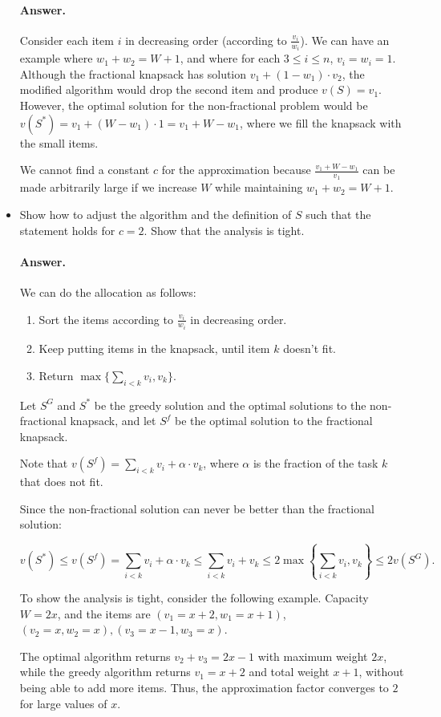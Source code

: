\documentclass[a4paper]{article}
\begin{document}
\begin{itemize}
	\paragraph{Answer.}
	
	Consider each item $i$ in decreasing order (according to $\frac{v_i}{w_i}$). We can have an example where $w_1 + w_2 = W + 1$, and where for each $3 \le i \le n$, $v_i = w_i = 1$.
	Although the fractional knapsack has solution $v_1 + (1-w_1)\cdot v_2$, the modified algorithm would drop the second item and produce $v(S) = v_1$. However, the optimal solution for the non-fractional problem would be $v(S^\ast) = v_1 + (W - w_1)\cdot 1 = v_1 + W - w_1$, where we fill the knapsack with the small items.
	
	We cannot find a constant $c$ for the approximation because $\frac{v_1 + W - w_1}{v_1}$ can be made arbitrarily large if we increase $W$ while maintaining $w_1 + w_2 = W+ 1$.
	
	\medskip
	
	\item Show how to adjust the algorithm and the definition of $S$ such that the statement holds for $c=2$. Show that the analysis is tight.
	\paragraph{Answer.}

	We can do the allocation as follows:
	
		\begin{enumerate}
		\item Sort the items according to $\frac{v_i}{w_i}$ in decreasing order.
		\item Keep putting items in the knapsack, until item $k$ doesn't fit.
		\item Return $\max\{\sum\limits_{i<k} v_i, v_k\}$.
	\end{enumerate}

Let $S^G$ and $S^\ast$ be the greedy solution and the optimal solutions to the non-fractional knapsack, and let $S^f$ be the optimal solution to the fractional knapsack.

Note that $v(S^f) = \sum\limits_{i < k}{v_i} + \alpha \cdot v_k$, where $\alpha$ is the fraction of the task $k$ that does not fit.

Since the non-fractional solution can never be better than the fractional solution:

$$v(S^\ast) \le v(S^f) = \sum\limits_{i < k}{v_i} + \alpha \cdot v_k \le \sum\limits_{i<k} v_i + v_k \le 2 \max \left \{\sum\limits_{i<k} v_i, v_k \right \} \le 2 v(S^G).$$

To show the analysis is tight, consider the following example.
Capacity $W = 2x$, and the items are $(v_1 = x + 2, w_1 = x + 1)$, $(v_2=x, w_2=x), (v_3=x-1, w_3 = x)$.

The optimal algorithm returns $v_2 + v_3 = 2x-1$ with maximum weight $2x$, while the greedy algorithm returns $v_1 = x+2$ and total weight $x+1$, without being able to add more items. Thus, the approximation factor converges to $2$ for large values of $x$.

\end{itemize}
\end{document}
